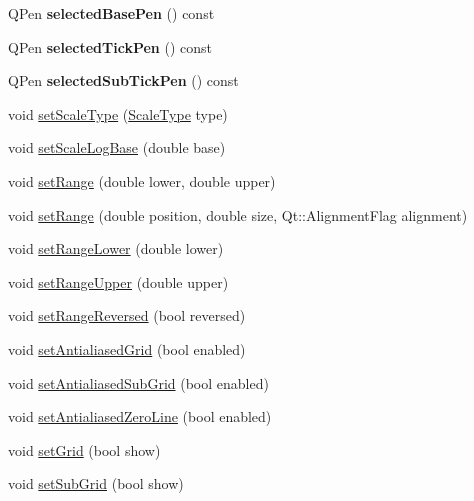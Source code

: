 \begin{DoxyCompactItemize}
\item 
\hypertarget{classQCPAxis_a5a3919ad7b60c2789b04c7e72387cfd6}{Q\-Pen {\bfseries selected\-Base\-Pen} () const }\label{classQCPAxis_a5a3919ad7b60c2789b04c7e72387cfd6}

\item 
\hypertarget{classQCPAxis_a9f86ef82e1d1a908ab4c68cfa5fe4175}{Q\-Pen {\bfseries selected\-Tick\-Pen} () const }\label{classQCPAxis_a9f86ef82e1d1a908ab4c68cfa5fe4175}

\item 
\hypertarget{classQCPAxis_a1b264fdfef48c22aba36e76de7856784}{Q\-Pen {\bfseries selected\-Sub\-Tick\-Pen} () const }\label{classQCPAxis_a1b264fdfef48c22aba36e76de7856784}

\item 
void \hyperlink{classQCPAxis_adb6c5c45bdf899ea221881dd3b43b406}{set\-Scale\-Type} (\hyperlink{classQCPAxis_a36d8e8658dbaa179bf2aeb973db2d6f0}{Scale\-Type} type)
\item 
void \hyperlink{classQCPAxis_a726186054be90487885a748aa1b42188}{set\-Scale\-Log\-Base} (double base)
\item 
void \hyperlink{classQCPAxis_a57d6ee9e9009fe88cb19db476ec70bca}{set\-Range} (double lower, double upper)
\item 
void \hyperlink{classQCPAxis_acf60e5b2d631fbc8c4548c3d579cb6d0}{set\-Range} (double position, double size, Qt\-::\-Alignment\-Flag alignment)
\item 
void \hyperlink{classQCPAxis_afcf51227d337db28d1a9ce9a4d1bc91a}{set\-Range\-Lower} (double lower)
\item 
void \hyperlink{classQCPAxis_acd3ca1247aa867b540cd5ec30ccd3bef}{set\-Range\-Upper} (double upper)
\item 
void \hyperlink{classQCPAxis_a2172fdb196b1a0dc3f40992fcad8e9e1}{set\-Range\-Reversed} (bool reversed)
\item 
void \hyperlink{classQCPAxis_a874fbc9e4586d60c1d095e3a89dea949}{set\-Antialiased\-Grid} (bool enabled)
\item 
void \hyperlink{classQCPAxis_abaabf77feec4457ba045f6f5aaa002d5}{set\-Antialiased\-Sub\-Grid} (bool enabled)
\item 
void \hyperlink{classQCPAxis_a73f4801569aaccb65d545530d77f5e8f}{set\-Antialiased\-Zero\-Line} (bool enabled)
\item 
void \hyperlink{classQCPAxis_a8d6d2bec40205fd3ca07cb1394663521}{set\-Grid} (bool show)
\item 
void \hyperlink{classQCPAxis_a7e5a64eaf71c64cadb790c5ce58d4729}{set\-Sub\-Grid} (bool show)

\end{DoxyCompactItemize}
